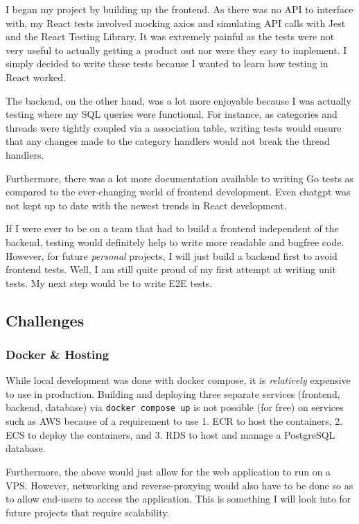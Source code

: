 \documentclass[12pt]{exam}
\begin{document}
I began my project by building up the frontend. As there was no API to
interface with, my React tests involved mocking axios and simulating API
calls with Jest and the React Testing Library. It was extremely painful
as the tests were not very useful to actually getting a product out nor
were they easy to implement. I simply decided to write these tests
because I wanted to learn how testing in React worked.

The backend, on the other hand, was a lot more enjoyable because I was
actually testing where my SQL queries were functional. For instance, as
categories and threads were tightly coupled via a association table,
writing tests would ensure that any changes made to the category
handlers would not break the thread handlers.

Furthermore, there was a lot more documentation available to writing Go
tests as compared to the ever-changing world of frontend development.
Even chatgpt was not kept up to date with the newest trends in React
development.

If I were ever to be on a team that had to build a frontend independent
of the backend, testing would definitely help to write more readable and
bugfree code. However, for future \emph{personal} projects, I will just
build a backend first to avoid frontend tests. Well, I am still quite
proud of my first attempt at writing unit tests. My next step would be
to write E2E tests.

\hypertarget{challenges}{%
\subsection{Challenges}\label{challenges}}

\hypertarget{docker-hosting}{%
\subsubsection{Docker \& Hosting}\label{docker-hosting}}

While local development was done with docker compose, it is
\emph{relatively} expensive to use in production. Building and deploying
three separate services (frontend, backend, database) via
\texttt{docker\ compose\ up} is not possible (for free) on services such
as AWS because of a requirement to use 1. ECR to host the containers, 2.
ECS to deploy the containers, and 3. RDS to host and manage a PostgreSQL
database.

Furthermore, the above would just allow for the web application to run
on a VPS. However, networking and reverse-proxying would also have to be
done so as to allow end-users to access the application. This is
something I will look into for future projects that require scalability.
\end{document}
